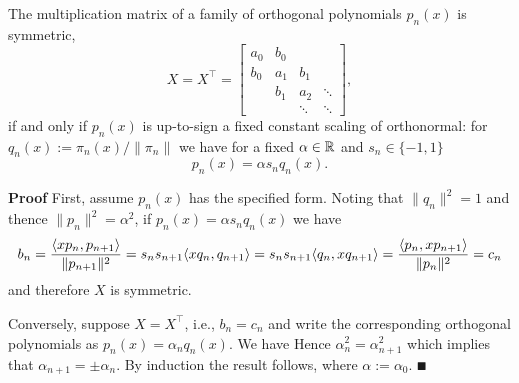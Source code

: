 \begin{corollary} The multiplication matrix of a family of orthogonal polynomials $p_n(x)$ is symmetric,
\[
X = X^\ensuremath{\top} = \begin{bmatrix} a_0 & b_0 \\
                                                        b_0 & a_1 & b_1\\
                                                        & b_1 & a_2 & \ensuremath{\ddots} \\
                                                        && \ensuremath{\ddots} & \ensuremath{\ddots}
                                                        \end{bmatrix},
\]
if and only if $p_n(x)$ is up-to-sign a fixed constant scaling of orthonormal: for $q_n(x) := \ensuremath{\pi}_n(x)/\|\ensuremath{\pi}_n\|$ we have for a fixed $\alpha \in {\mathbb R}$ and $s_n \ensuremath{\in} \{-1,1\}$
\[
p_n(x) = \ensuremath{\alpha} s_n q_n(x).
\]
\end{corollary}
\textbf{Proof} First, assume $p_n(x)$ has the specified form. Noting that $\|q_n\|^2 = 1$ and thence $\|p_n\|^2 = \ensuremath{\alpha}^2$, if $p_n(x) = \ensuremath{\alpha} s_n q_n(x)$ we have
\[
b_n = {\ensuremath{\langle}xp_n, p_{n+1}\ensuremath{\rangle} \over \|p_{n+1}\|^2} = s_n s_{n+1} \ensuremath{\langle}x q_n, q_{n+1}\ensuremath{\rangle} =
s_n s_{n+1} \ensuremath{\langle}q_n, x q_{n+1}\ensuremath{\rangle} = {\ensuremath{\langle}p_n, xp_{n+1}\ensuremath{\rangle} \over \|p_n\|^2} = c_{n}
\]
and therefore $X$ is symmetric.

Conversely, suppose $X = X^\ensuremath{\top}$, i.e., $b_n = c_{n}$ and write the corresponding orthogonal polynomials as $p_n(x) = \ensuremath{\alpha}_n q_n(x)$. We have
Hence $\ensuremath{\alpha}_n^2 = \ensuremath{\alpha}_{n+1}^2$ which implies that $\ensuremath{\alpha}_{n+1} = \ensuremath{\pm} \ensuremath{\alpha}_n$. By induction the result follows, where $\ensuremath{\alpha} := \ensuremath{\alpha}_0$. \ensuremath{\QED}

